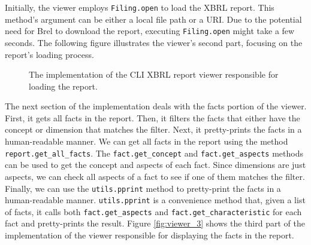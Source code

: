 Initially, the viewer employs \texttt{Filing.open} to load the XBRL report.
This method's argument can be either a local file path or a URI.
Due to the potential need for Brel to download the report, executing \texttt{Filing.open} might take a few seconds.
The following figure illustrates the viewer's second part, focusing on the report's loading process.

\begin{figure}[H]
    \centering
    
    \label{fig:viewer_2}
    \caption{The implementation of the CLI XBRL report viewer responsible for loading the report.}
\end{figure}

The next section of the implementation deals with the facts portion of the viewer.
First, it gets all facts in the report.
Then, it filters the facts that either have the concept or dimension that matches the filter.
Next, it pretty-prints the facts in a human-readable manner.
We can get all facts in the report using the method \texttt{report.get\_all\_facts}.
The \texttt{fact.get\_concept} and \texttt{fact.get\_aspects} methods can be used to get the concept and aspects of each fact.
Since dimensions are just aspects, we can check all aspects of a fact to see if one of them matches the filter.
Finally, we can use the \texttt{utils.pprint} method to pretty-print the facts in a human-readable manner.
\texttt{utils.pprint} is a convenience method that, given a list of facts, it calls both \texttt{fact.get\_aspects} and \texttt{fact.get\_characteristic} for each fact and pretty-prints the result.
Figure \ref{fig:viewer_3} shows the third part of the implementation of the viewer responsible for displaying the facts in the report.


